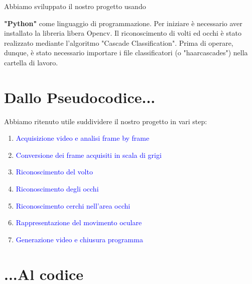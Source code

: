 \documentclass[12pt]{article}
\begin{document}
Abbiamo sviluppato il nostro progetto usando {\textbf{"Python"} come linguaggio di programmazione. Per iniziare è necessario aver installato la libreria libera Opencv. Il riconoscimento di volti ed occhi è stato realizzato mediante l'algoritmo "Cascade Classification". Prima di operare, dunque, è stato necessario importare i file classificatori (o "haarcascades") nella cartella di lavoro.
\pagebreak

\section{Dallo Pseudocodice...}
Abbiamo ritenuto utile suddividere il nostro progetto in vari step:
\begin{enumerate}
	\item \label{primo}\textcolor{blue}{Acquisizione video e analisi frame by frame}
	\item \label{secondo} \textcolor{blue}{Conversione dei frame acquisiti in scala di grigi}
	\item \label{terzo} \textcolor{blue}{Riconoscimento del volto}
	\item \label{quarto}\textcolor{blue}{Riconoscimento degli occhi}
    \item \label{quinto}\textcolor{blue}{Riconoscimento cerchi nell'area occhi}
    \item \label{sesto}\textcolor{blue}{Rappresentazione del movimento oculare}
    \item \label{settimo}\textcolor{blue}{Generazione video e chiusura programma}
\end{enumerate}

\pagebreak
\section{...Al codice}


}
\end{document}
